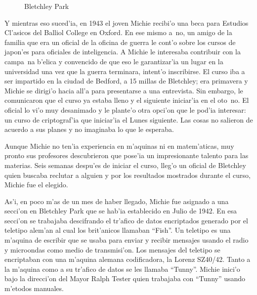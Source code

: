 \documentclass[11pt]{article}
\begin{document}
\begin{figure}[h]

\centering
{}
\caption[Bletchley Park]{Bletchley Park} 
\label{fig:bp}

\end{figure}

\medskip


Y mientras eso suced'ia, en 1943 el joven Michie recibi'o una beca para Estudios Cl'asicos del Balliol College en Oxford. En ese mismo a~no, un amigo de la familia que era un oficial de la oficina de guerra le cont'o sobre los cursos de japon'es para oficiales de inteligencia. A Michie le interesaba contribuir con la campa~na b'elica y convencido de que eso le garantizar'ia un lugar en la universidad una vez que la guerra terminara, intent'o inscribirse. El curso iba a ser impartido en la ciudad de Bedford, a 15 millas de Bletchley; era primavera y Michie se dirigi'o hacia all'a para presentarse a una entrevista. Sin embargo, le comunicaron que el curso ya estaba lleno y el siguiente iniciar'ia en el oto~no. El oficial lo vi'o muy desanimado y le plante'o otra opci'on que le pod'ia interesar: un curso de criptograf'ia que iniciar'ia el Lunes siguiente. Las cosas no salieron de acuerdo a sus planes y no imaginaba lo que le esperaba.

Aunque Michie no ten'ia experiencia en m'aquinas ni en matem'aticas, muy pronto sus profesores descubrieron que pose'ia un impresionante talento para las materias. Seis semanas despu'es de iniciar el curso, lleg'o un oficial de Bletchley quien buscaba reclutar a alguien y por los resultados mostrados durante el curso, Michie fue el elegido.

As'i, en poco m'as de un mes de haber llegado, Michie fue asignado a una secci'on en Bletchley Park que se hab'ia establecido en Julio de 1942. En esa secci'on se trabajaba descifrando el tr'afico de datos encriptados generado por el teletipo alem'an al cual los brit'anicos llamaban ``Fish''. Un teletipo es una m'aquina de escribir que se usaba para enviar y recibir mensajes usando el radio y microondas como medio de transmisi'on. Los mensajes del teletipo se encriptaban con una m'aquina alemana codificadora, la Lorenz SZ40/42. Tanto a la m'aquina como a su tr'afico de datos se les llamaba ``Tunny''. Michie inici'o bajo la direcci'on del Mayor Ralph Tester quien trabajaba con ``Tunny'' usando m'etodos manuales. 
\end{document}
